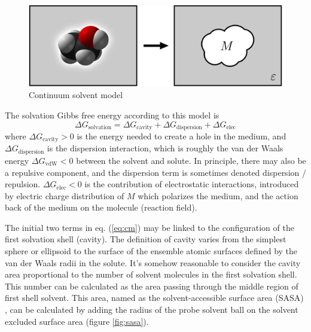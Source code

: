 \begin{figure}[h]
\begin{centering}
\includegraphics[width=0.72\columnwidth]{_figure/reaction-field-model_2}
\par\end{centering}

\caption{Continuum solvent model\label{fig:Reaction-field-model}}
\end{figure}


The solvation Gibbs free energy according to this model is
\begin{equation}
\Delta G_{\mathrm{solvation}}=\Delta G_{\mathrm{cavity}}+\Delta G_{\mathrm{dispersion}}+\Delta G_{\mathrm{elec}}\label{eq:cm}
\end{equation}
where $\Delta G_{\mathrm{cavity}}>0$ is the energy needed to create
a hole in the medium, and $\Delta G_{\mathrm{dispersion}}$ is the
dispersion interaction, which is roughly the van der Waals energy
$\Delta G_{\mathrm{vdW}}<0$ between the solvent and solute. In principle,
there may also be a repulsive component, and the dispersion term is
sometimes denoted dispersion / repulsion. $\Delta G_{\mathrm{elec}}<0$
is the contribution of electrostatic interactions, introduced by electric
charge distribution of $M$ which polarizes the medium, and the action
back of the medium on the molecule (reaction field). 

The initial two terms in eq. (\ref{eq:cm}) may be linked to the configuration
of the first solvation shell (cavity). The definition of cavity varies
from the simplest sphere or ellipsoid to the surface of the ensemble
atomic surfaces defined by the van der Waals radii in the solute.
It's somehow reasonable to consider the cavity area proportional to
the number of solvent molecules in the first solvation shell. This
number can be calculated as the area passing through the middle region
of first shell solvent. This area, named as the solvent-accessible
surface area (SASA) \citep{SAS_1,SAS_2}, can be calculated by adding
the radius of the probe solvent ball on the solvent excluded surface
area (figure \ref{fig:sasa}).

